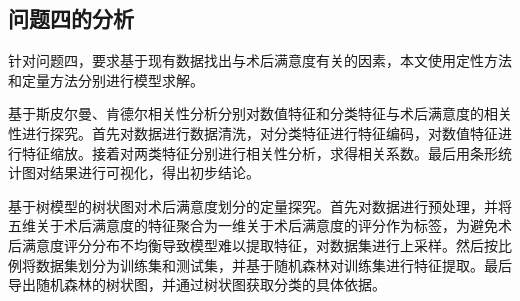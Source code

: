 \subsection{问题四的分析}

针对问题四，要求基于现有数据找出与术后满意度有关的因素，本文使用定性方法和定量方法分别进行模型求解。

基于斯皮尔曼、肯德尔相关性分析分别对数值特征和分类特征与术后满意度的相关性进行探究。首先对数据进行数据清洗，对分类特征进行特征编码，对数值特征进行特征缩放。接着对两类特征分别进行相关性分析，求得相关系数。最后用条形统计图对结果进行可视化，得出初步结论。

基于树模型的树状图对术后满意度划分的定量探究。首先对数据进行预处理，并将五维关于术后满意度的特征聚合为一维关于术后满意度的评分作为标签，为避免术后满意度评分分布不均衡导致模型难以提取特征，对数据集进行上采样。然后按比例将数据集划分为训练集和测试集，并基于随机森林对训练集进行特征提取。最后导出随机森林的树状图，并通过树状图获取分类的具体依据。














